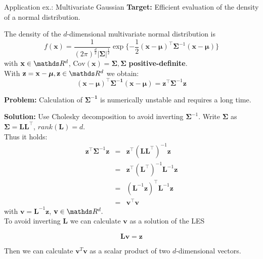 \begin{vbframe}{Application ex.: Multivariate Gaussian}
\textbf{Target:} Efficient evaluation of the density of a normal distribution.
\medskip

The density of the $d$-dimensional multivariate normal distribution is
\medskip
$$
f(\mathbf{x})= \frac{1}{(2\pi)^\frac{d}{2}|\boldsymbol{\Sigma}|^\frac{1}{2}} \exp\{-\frac{1}{2}(\mathbf{x}-\boldsymbol{\mu})^\top \boldsymbol{\Sigma}^{-1} (\mathbf{x}-\boldsymbol{\mu})\}
$$
\medskip
with $\mathbf{x}\in\R^{d}$, $\text{Cov}(\mathbf{x}) = \boldsymbol{\Sigma}, \boldsymbol{\Sigma}$ \textbf{positive-definite}.\\
\medskip
With $\mathbf{z} = \mathbf{x}-\boldsymbol{\mu}, \mathbf{z}\in\R^{d} $ we obtain:
$$
(\mathbf{x}-\boldsymbol{\mu})^\top \boldsymbol{\Sigma^{-1}} (\mathbf{x}-\boldsymbol{\mu}) = \mathbf{z}^\top \boldsymbol{\Sigma}^{-1}\mathbf{z}
$$

\lz

\textbf{Problem:} Calculation of $\boldsymbol{\Sigma^{-1}}$ is numerically unstable and requires a long time.
\framebreak

\textbf{Solution:} Use Cholesky decomposition to avoid inverting $\boldsymbol{\Sigma}^{-1}$.
Write $\boldsymbol{\Sigma}$ as  $\boldsymbol{\Sigma} = \mathbf{L}\mathbf{L}^\top$, $rank(\mathbf{L}) = d$.\\
\medskip
Thus it holds:
\begin{eqnarray*}
  \mathbf{z}^\top \boldsymbol{\Sigma}^{-1} \mathbf{z}  &=&  \mathbf{z}^\top (\mathbf{L}\mathbf{L}^\top)^{-1}\mathbf{z} \\
                                                      &=&  \mathbf{z}^\top (\mathbf{L}^\top)^{-1} \mathbf{L}^{-1} \mathbf{z} \\
                                                      &=&  (\mathbf{L}^{-1} \mathbf{z})^\top\mathbf{L}^{-1} \mathbf{z}\\
                                                      &=&  \mathbf{v}^\top\mathbf{v}
\end{eqnarray*}
with $\mathbf{v} = \mathbf{L}^{-1} \mathbf{z}$, $\mathbf{v}\in\R^{d}.$\\
\medskip
To avoid inverting $\mathbf{L}$ we can calculate $\mathbf{v}$ as a solution of the LES

\vspace*{-0.2cm}
$$
\mathbf{L}\mathbf{v} = \mathbf{z}
$$


\medskip
Then we can calculate $\mathbf{v}^{T}\mathbf{v}$ as a scalar product of two $d$-dimensional vectors.
\end{vbframe}



\endlecture








